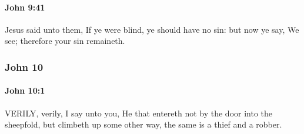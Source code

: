 		\paragraph{John 9:41} %
			\label{JOHN-9-41}

			Jesus said unto them, If ye were blind, ye should have no sin: but now ye say, We see; therefore your sin remaineth.

			\begin{framed}
			\scriptsize
				\begin{compactdesc}
					\item[SBLG] 
				\end{compactdesc}
			\end{framed}

	\subsubsection{John 10} %
		\label{JOHN-10}
		
		\paragraph{John 10:1} %
			\label{JOHN-10-1}
			
			VERILY, verily, I say unto you, He that entereth not by the door into the sheepfold, but climbeth up some other way, the same is a thief and a robber.

